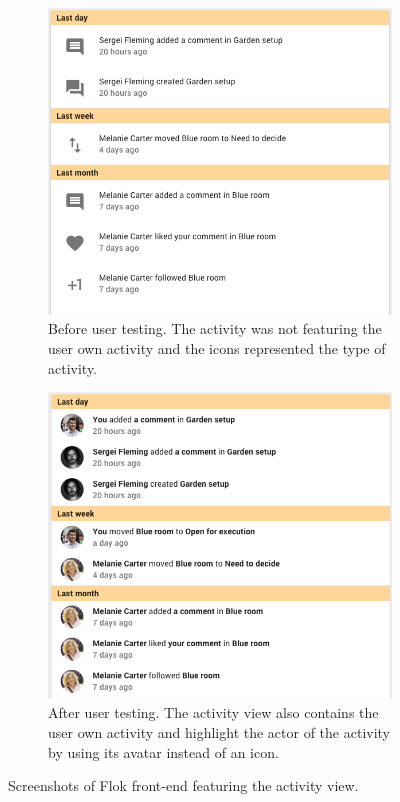\documentclass[a4paper,12pt,twoside]{article}
\begin{document}
\begin{figure}[!htb]
    \begin{subfigure}[t]{.495\textwidth}
        \includegraphics[width=\textwidth]{images/user_tests/activity_before.png}
        \caption{Before user testing. The activity was not featuring the user own activity and the icons represented the type of activity.}
        \label{fig.tests.activity.before}
    \end{subfigure}
    \hfill
    \begin{subfigure}[t]{.495\textwidth}
        \includegraphics[width=\textwidth]{images/user_tests/activity_after.png}
        \caption{After user testing. The activity view also contains the user own activity and highlight the actor of the activity by using its avatar instead of an icon.}
        \label{fig.tests.activity.after}
    \end{subfigure}
    \caption{Screenshots of Flok front-end featuring the activity view.}
    \label{fig.tests.activity}
\end{figure}
\end{document}

